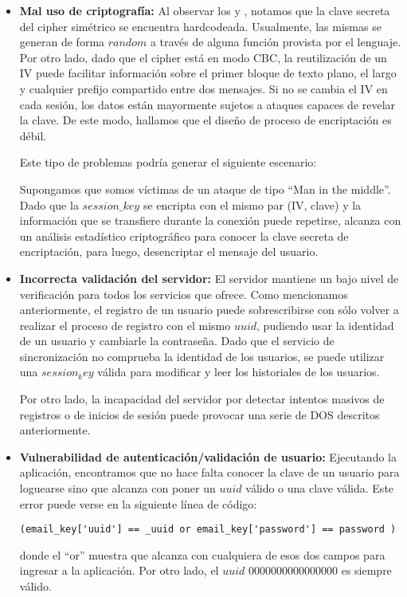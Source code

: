 \documentclass[10pt, a4paper]{article}
\begin{document}
\begin{itemize}

\item \textbf{Mal uso de criptografía:} Al observar los  y , notamos que la clave secreta del cipher simétrico se encuentra hardcodeada. Usualmente, las mismas se generan de forma $random$ a través de alguna función provista por el lenguaje. 
Por otro lado, dado que el cipher está en modo CBC, la reutilización de un IV puede facilitar información sobre el primer bloque de texto plano, el largo y cualquier prefijo compartido entre dos mensajes.
Si no se cambia el IV en cada sesión, los datos están mayormente sujetos a ataques capaces de revelar la clave. De este modo, hallamos que el diseño de proceso de encriptación es débil.

Este tipo de problemas podría generar el siguiente escenario:

Supongamos que somos víctimas de un ataque de tipo ``Man in the middle''. Dado que la $session\_key$ se encripta con el mismo par (IV, clave) y la información que se transfiere durante la conexión puede repetirse, alcanza con un análisis estadístico criptográfico para conocer la clave secreta de encriptación, para luego, desencriptar el mensaje del usuario.

\item \textbf{Incorrecta validación del servidor:} El servidor mantiene un bajo nivel de verificación para todos los servicios que ofrece. Como mencionamos anteriormente, el registro de un usuario puede sobrescribirse con sólo volver a realizar el proceso de registro con el mismo $uuid$, pudiendo usar la identidad de un usuario y cambiarle la contraseña. Dado que el servicio de sincronización no comprueba la identidad de los usuarios, se puede utilizar una $session_key$ válida para modificar y leer los historiales de los usuarios.

Por otro lado, la incapacidad del servidor por detectar intentos masivos de registros o de inicios de sesión puede provocar una serie de DOS descritos anteriormente.

\item \textbf{Vulnerabilidad de autenticación/validación de usuario:} Ejecutando la aplicación, encontramos que no hace falta conocer la clave de un usuario para loguearse sino que alcanza con poner un $uuid$ válido o una clave válida. Este error puede verse en la siguiente línea de código:
\begin{verbatim}
(email_key['uuid'] == _uuid or email_key['password'] == password )
\end{verbatim}
donde el ``or'' muestra que alcanza con cualquiera de esos dos campos para ingresar a la aplicación.
Por otro lado, el $uuid$ 0000000000000000 es siempre válido.


\end{itemize}
\end{document}
